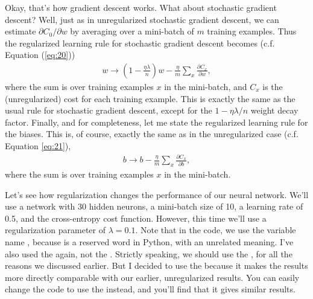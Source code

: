\documentclass[a4paper,twoside,10pt]{book}
\begin{document}
Okay, that's how gradient descent works. What about stochastic gradient descent? Well, just as in unregularized stochastic gradient descent, we can estimate $\partial{}C_0/\partial{}w$ by averaging over a mini-batch of $m$ training examples. Thus the regularized learning rule for stochastic gradient descent becomes (c.f. Equation (\ref{eq:20}))
\begin{eqnarray} 
w \rightarrow \left(1-\frac{\eta \lambda}{n}\right) w -\frac{\eta}{m} \sum_x \frac{\partial C_x}{\partial w}, 
\label{eq:93}
\end{eqnarray}
where the sum is over training examples $x$ in the mini-batch, and $C_x$ is the (unregularized) cost for each training example. This is exactly the same as the usual rule for stochastic gradient descent, except for the $1-\eta\lambda/n$ weight decay factor. Finally, and for completeness, let me state the regularized learning rule for the biases. This is, of course, exactly the same as in the unregularized case (c.f. Equation \ref{eq:21}),
\begin{eqnarray}
	b \to b - \frac{\eta}{m} \sum_x \frac{\partial C_x}{\partial b},
	\label{eq:94}
\end{eqnarray}
where the sum is over training examples $x$ in the mini-batch.

Let's see how regularization changes the performance of our neural network. We'll use a network with 30 hidden neurons, a mini-batch size of 10, a learning rate of 0.5, and the cross-entropy cost function. However, this time we'll use a regularization parameter of $\lambda =0.1$. Note that in the code, we use the variable name , because  is a reserved word in Python, with an unrelated meaning. I've also used the  again, not the . Strictly speaking, we should use the , for all the reasons we discussed earlier. But I decided to use the  because it makes the results more directly comparable with our earlier, unregularized results. You can easily change the code to use the  instead, and you'll find that it gives similar results.
\end{document}
